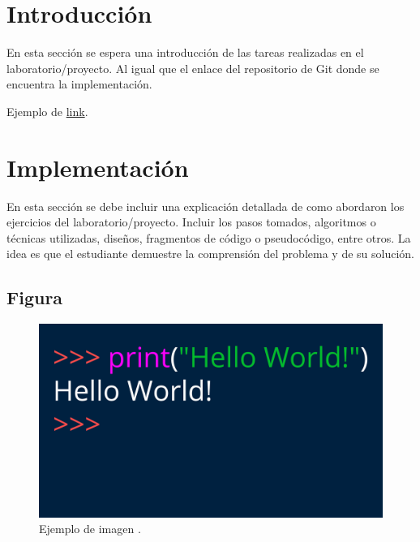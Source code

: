 \documentclass[12pt,letterpaper]{article}
\begin{document}


\tableofcontents

\newpage


\section{Introducción}

En esta sección se espera una introducción de las tareas realizadas en el laboratorio/proyecto. Al igual que el enlace del repositorio de Git donde se encuentra la implementación.

Ejemplo de \href{https://www.google.com}{link}.


\section{Implementación}

En esta sección se debe incluir una explicación detallada de como abordaron los ejercicios del laboratorio/proyecto. Incluir los pasos tomados, algoritmos o técnicas utilizadas, diseños, fragmentos de código o pseudocódigo, entre otros. La idea es que el estudiante demuestre la comprensión del problema y de su solución.

\subsection{Figura}

\begin{figure}[h]
    \centering
    \includegraphics[scale=0.1]{Images/hello_world_py.jpeg}
    \caption{Ejemplo de imagen \cite{knuth:1984}.}
    \label{fig:ejemplo_imagen}
\end{figure}
\end{document}
